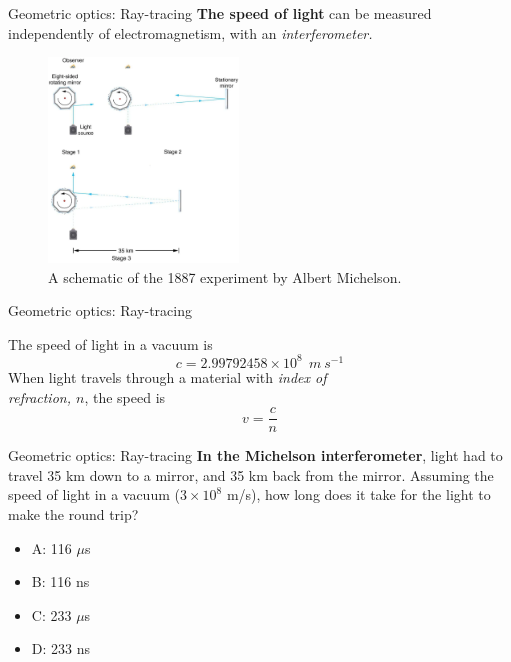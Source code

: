 \documentclass{beamer}
\begin{document}
\begin{frame}{Geometric optics: Ray-tracing}
\small
\textbf{\alert{The speed of light}} can be measured independently of electromagnetism, with an \textit{interferometer.}
\begin{figure}
\centering
\includegraphics[width=0.45\textwidth]{figures/michelson.png}
\caption{\label{fig:mich} A schematic of the 1887 experiment by Albert Michelson.}
\end{figure}
\end{frame}

\begin{frame}{Geometric optics: Ray-tracing}
\begin{tcolorbox}[colback=white,colframe=black!40!black,title=The Speed of Light]
\alert{The speed of light in a vacuum is
\begin{equation}
c = 2.99792458 \times 10^8~~m~s^{-1}
\end{equation}
When light travels through a material with \textit{index of \\ refraction, $n$}, the speed is
\begin{equation}
v = \frac{c}{n}
\end{equation}
}
\end{tcolorbox}
\end{frame}

\begin{frame}{Geometric optics: Ray-tracing}
\textbf{In the Michelson interferometer}, light had to travel 35 km down to a mirror, and 35 km back from the mirror.  Assuming the speed of light in a vacuum ($3\times 10^8$ m/s), how long does it take for the light to make the round trip?
\begin{itemize}
\item A: 116 $\mu$s
\item B: 116 ns
\item C: 233 $\mu$s
\item D: 233 ns
\end{itemize}
\end{frame}
\end{document}
